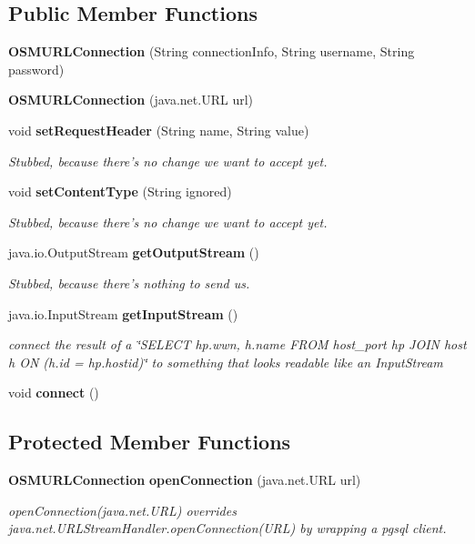 \subsection*{Public Member Functions}
\begin{DoxyCompactItemize}
\item 
{\bf O\+S\+M\+U\+R\+L\+Connection} (String connection\+Info, String username, String password)
\item 
{\bf O\+S\+M\+U\+R\+L\+Connection} (java.\+net.\+U\+R\+L url)
\item 
void {\bf set\+Request\+Header} (String name, String value)
\begin{DoxyCompactList}\small\item\em Stubbed, because there's no change we want to accept yet. \end{DoxyCompactList}\item 
void {\bf set\+Content\+Type} (String ignored)
\begin{DoxyCompactList}\small\item\em Stubbed, because there's no change we want to accept yet. \end{DoxyCompactList}\item 
java.\+io.\+Output\+Stream {\bf get\+Output\+Stream} ()
\begin{DoxyCompactList}\small\item\em Stubbed, because there's nothing to send us. \end{DoxyCompactList}\item 
java.\+io.\+Input\+Stream {\bf get\+Input\+Stream} ()
\begin{DoxyCompactList}\small\item\em connect the result of a \char`\"{}\+S\+E\+L\+E\+C\+T hp.\+wwn, h.\+name F\+R\+O\+M host\+\_\+port hp J\+O\+I\+N host h O\+N (h.\+id = hp.\+hostid)\char`\"{} to something that looks readable like an Input\+Stream \end{DoxyCompactList}\item 
void {\bf connect} ()
\end{DoxyCompactItemize}
\subsection*{Protected Member Functions}
\begin{DoxyCompactItemize}
\item 
{\bf O\+S\+M\+U\+R\+L\+Connection} {\bf open\+Connection} (java.\+net.\+U\+R\+L url)
\begin{DoxyCompactList}\small\item\em open\+Connection(java.\+net.\+U\+R\+L) overrides java.\+net.\+U\+R\+L\+Stream\+Handler.\+open\+Connection(\+U\+R\+L) by wrapping a pgsql client. \end{DoxyCompactList}\end{DoxyCompactItemize}
